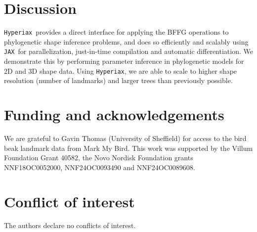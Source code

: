 \documentclass[unnumsec,webpdf,contemporary,large]{oup-authoring-template}
\newcommand{\Hyperiax}{\texttt{Hyperiax}}
\newcommand{\JAX}{\texttt{JAX}}
\begin{document}
\section{Discussion}
\Hyperiax\ provides a direct interface for applying the BFFG operations to phylogenetic shape inference problems, and does so efficiently and scalably using \JAX\ for parallelization, just-in-time compilation and automatic differentiation. We demonstrate this by performing parameter inference in phylogenetic models for 2D and 3D shape data. Using \Hyperiax, we are able to scale to higher shape resolution (number of landmarks) and larger trees than previously possible.

\section*{Funding and acknowledgements}
We are grateful to Gavin Thomas (University of Sheffield) for access to the bird beak landmark data from Mark My Bird.
This work was supported by the Villum Foundation Grant 40582, the Novo Nordisk Foundation grants NNF18OC0052000, NNF24OC0093490 and NNF24OC0089608.

\section*{Conflict of interest}
The authors declare no conflicts of interest.



\end{document}
